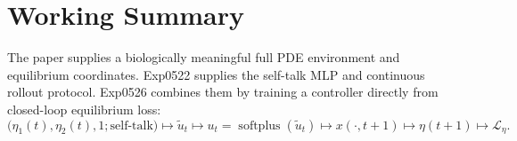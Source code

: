 \documentclass[11pt]{article}
\newcommand{\softplus}{\operatorname{softplus}}
\begin{document}
\section{Working Summary}

The paper supplies a biologically meaningful full PDE environment and
equilibrium coordinates. Exp0522 supplies the self-talk MLP and continuous
rollout protocol. Exp0526 combines them by training a controller directly
from closed-loop equilibrium loss:
\[
  \big(\eta_1(t),\eta_2(t),1;\text{self-talk}\big)
  \mapsto
  \tilde u_t
  \mapsto
  u_t=\softplus(\tilde u_t)
  \mapsto
  x(\cdot,t+1)
  \mapsto
  \eta(t+1)
  \mapsto
  \mathcal L_\eta.
\]



\end{document}
